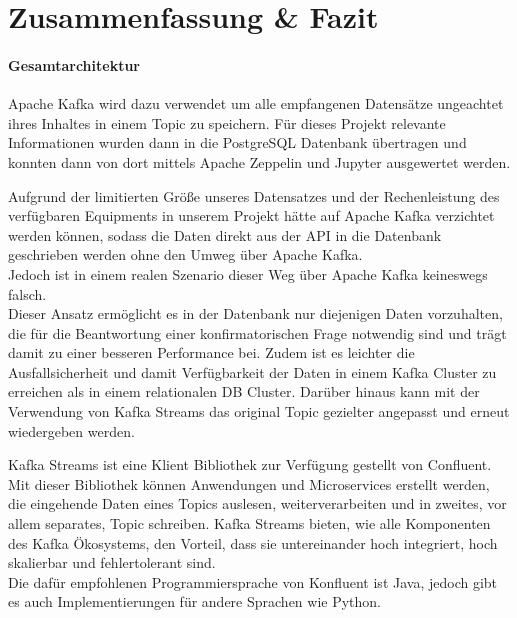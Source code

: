 \chapter{Zusammenfassung \& Fazit}
\label{chap:fazit}

\subsubsection{Gesamtarchitektur}

Apache Kafka wird dazu verwendet um alle empfangenen Datensätze ungeachtet ihres Inhaltes in einem Topic zu speichern.
Für dieses Projekt relevante Informationen wurden dann in die PostgreSQL Datenbank übertragen und konnten dann von dort mittels Apache Zeppelin und Jupyter ausgewertet werden.

Aufgrund der limitierten Größe unseres Datensatzes und der Rechenleistung des verfügbaren Equipments in unserem Projekt
hätte auf Apache Kafka verzichtet werden können, sodass die Daten direkt aus der \ac{API} in die Datenbank geschrieben werden
ohne den \glqq Umweg\grqq{} über Apache Kafka.\\
Jedoch ist in einem realen Szenario dieser Weg über Apache Kafka keineswegs falsch.\\
Dieser Ansatz ermöglicht es in der Datenbank nur diejenigen Daten vorzuhalten, die für die Beantwortung einer konfirmatorischen Frage notwendig sind und trägt damit zu einer besseren Performance bei. Zudem ist es leichter die Ausfallsicherheit und damit Verfügbarkeit der Daten in einem Kafka Cluster zu erreichen als in einem relationalen DB Cluster.
Darüber hinaus kann mit der Verwendung von Kafka Streams das original Topic gezielter angepasst und erneut wiedergeben werden.

Kafka Streams ist eine Klient Bibliothek zur Verfügung gestellt von Confluent.
Mit dieser Bibliothek können Anwendungen und Microservices erstellt werden, die eingehende Daten eines Topics
auslesen, weiterverarbeiten und in zweites, vor allem separates, Topic schreiben.
Kafka Streams bieten, wie alle Komponenten des Kafka Ökosystems, den Vorteil, dass sie untereinander hoch integriert,
hoch skalierbar und fehlertolerant sind.\\
Die dafür empfohlenen Programmiersprache von Konfluent ist Java,
jedoch gibt es auch Implementierungen für andere Sprachen wie \zb{} Python.\autocite{KafkaStreams}

